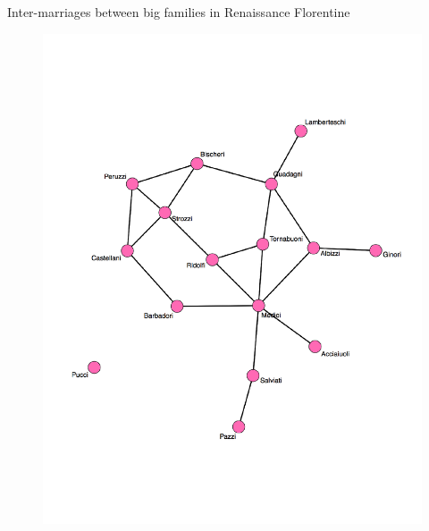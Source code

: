 \documentclass[10pt]{beamer}
\begin{document}
\begin{frame}{Inter-marriages between big families in Renaissance Florentine}
	\begin{figure}
	\centering
	\includegraphics[scale=0.37]{Figs/marriage}
	\end{figure}
\end{frame}
\end{document}
